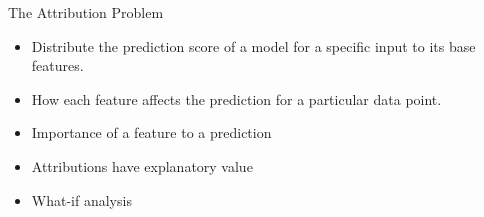 \begin{frame}{The Attribution Problem\footnotemark}
	\begin{itemize}\setlength\itemsep{2em}
		\item Distribute the prediction score of a model for a specific input to its base features.
		\item How each feature affects the prediction for a particular data point.
		\item Importance of a feature to a prediction
		\item Attributions have explanatory value
		\item What-if analysis
	\end{itemize}
\end{frame}